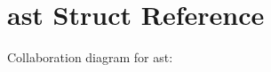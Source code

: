 \hypertarget{structast}{}\section{ast Struct Reference}
\label{structast}


Collaboration diagram for ast\+:
